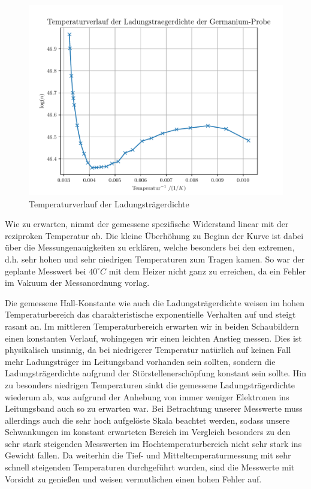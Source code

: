 \begin{figure}[htbp] 
     \includegraphics[scale=0.7]{temp_n.pdf}
  \caption{Temperaturverlauf der Ladungsträgerdichte}
  \label{n}
\end{figure}

Wie zu erwarten, nimmt der gemessene spezifische Widerstand linear mit der reziproken Temperatur ab. Die kleine Überhöhung zu Beginn der Kurve ist dabei über die Messungenauigkeiten zu erklären, welche besonders bei den extremen, d.h. sehr hohen und sehr niedrigen Temperaturen zum Tragen kamen. So war der geplante Messwert bei $40^{\circ}C$ mit dem Heizer nicht ganz zu erreichen, da ein Fehler im Vakuum der Messanordnung vorlag.  

Die gemessene Hall-Konstante wie auch die Ladungsträgerdichte weisen im hohen Temperaturbereich das charakteristische exponentielle Verhalten auf und steigt rasant an. Im mittleren Temperaturbereich erwarten wir in beiden Schaubildern einen konstanten Verlauf, wohingegen wir einen leichten Anstieg messen. Dies ist physikalisch unsinnig, da bei niedrigerer Temperatur natürlich auf keinen Fall mehr Ladungsträger im Leitungsband vorhanden sein sollten, sondern die Ladungsträgerdichte aufgrund der Störstellenerschöpfung konstant sein sollte. Hin zu besonders niedrigen Temperaturen sinkt die gemessene Ladungsträgerdichte wiederum ab, was aufgrund der Anhebung von immer weniger Elektronen ins Leitungsband auch so zu erwarten war. 
Bei Betrachtung unserer Messwerte muss allerdings auch die sehr hoch aufgelöste Skala beachtet werden, sodass unsere Schwankungen im konstant erwarteten Bereich im Vergleich besonders zu den sehr stark steigenden Messwerten im Hochtemperaturbereich nicht sehr stark ins Gewicht fallen. Da weiterhin die Tief- und Mitteltemperaturmessung mit sehr schnell steigenden Temperaturen durchgeführt wurden, sind die Messwerte mit Vorsicht zu genießen und weisen vermutlichen einen hohen Fehler auf.

